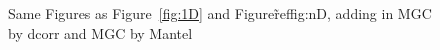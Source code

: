 \documentclass[11pt]{article}
\begin{document}
\begin{figure}[htbp]
\hfil
{}
\caption{Same Figures as Figure~\ref{fig:1D} and Figure\~ref{fig:nD}, adding in MGC by dcorr and MGC by Mantel}
\label{fig:D2}
\end{figure}
\end{document}
